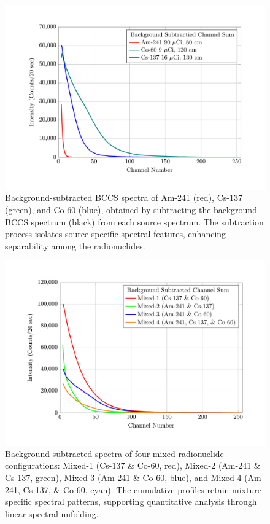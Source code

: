 \documentclass[10pt]{wlscirep}
\begin{document}
\begin{figure}[ht]
\centering
\includegraphics[width=\linewidth]{figure/fig03_csn.pdf}
\caption{Background-subtracted BCCS spectra of Am-241 (red), Cs-137 (green), and Co-60 (blue), obtained by subtracting the background BCCS spectrum (black) from each source spectrum. The subtraction process isolates source-specific spectral features, enhancing separability among the radionuclides.}
\label{fig:csn}
\end{figure}

\begin{figure}[ht]
\centering
\includegraphics[width=\linewidth]{figure/fig04_CSBS.pdf}
\caption{Background-subtracted  spectra of four mixed radionuclide configurations: Mixed-1 (Cs-137 \& Co-60, red), Mixed-2 (Am-241 \& Cs-137, green), Mixed-3 (Am-241 \& Co-60, blue), and Mixed-4 (Am-241, Cs-137, \& Co-60, cyan). The cumulative profiles retain mixture-specific spectral patterns, supporting quantitative analysis through linear spectral unfolding.}
\label{fig:csbrs}
\end{figure}
\end{document}
